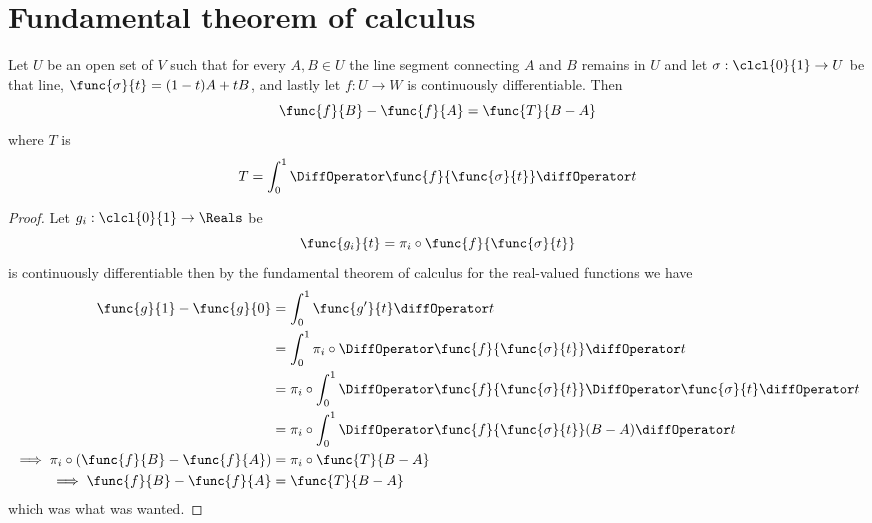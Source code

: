 \section{Fundamental theorem of calculus}
\begin{theorem}
    Let \(U\) be an open set of \(V\) such that for every \(A,B \in U\) the line segment connecting \(A\) and \(B\) remains in \(U\) and let \(\sigma : \clcl{0}{1}\to U\) be that line, \(\func{\sigma}{t} = (1-t)A + tB\), and lastly let \(f: U \to W\) is continuously differentiable. Then
    \begin{equation*}
        \func{f}{B} - \func{f}{A} = \func{T}{B - A}
    \end{equation*}
    where \(T\) is
    \begin{equation*}
        T = \int_{0}^{1} \DiffOperator \func{f}{ \func{\sigma}{t}} \diffOperator t
    \end{equation*}
\end{theorem}

\begin{proof}
    Let \(g_i : \clcl{0}{1} \to \Reals\) be
    \begin{equation*}
        \func{g_i}{t} = \pi_i \circ \func{f}{\func{\sigma}{t}}
    \end{equation*}
    is continuously differentiable then by the fundamental theorem of calculus for the real-valued functions we have
    \begin{align*}
        \func{g}{1} - \func{g}{0}                                   & = \int_{0}^{1} \func{g'}{t} \diffOperator t                                                                        \\
                                                                    & = \int_{0}^{1} \pi_i \circ \DiffOperator \func{f}{\func{\sigma}{t}} \diffOperator t                                \\
                                                                    & = \pi_i \circ \int_{0}^{1} \DiffOperator \func{f}{\func{\sigma}{t}} \DiffOperator \func{\sigma}{t} \diffOperator t \\
                                                                    & = \pi_i \circ \int_{0}^{1} \DiffOperator \func{f}{\func{\sigma}{t}} (B - A) \diffOperator t                        \\
        \implies \pi_i \circ \left(\func{f}{B} - \func{f}{A}\right) & = \pi_i \circ \func{T}{B- A}                                                                                       \\
        \implies \func{f}{B} - \func{f}{A}                          & =\func{T}{B- A}
    \end{align*}
    which was what was wanted.
\end{proof}

